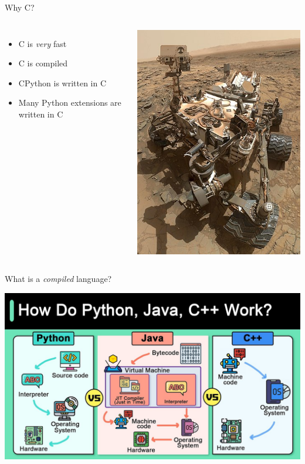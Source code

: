 \documentclass[12pt, aspectration=169]{beamer}
\begin{document}
    \begin{frame}{Why C?}
        \begin{columns}
            \begin{itemize}
                \item C is \textit{very} fast
                \item C is compiled
                \item CPython is written in C
                \item Many Python extensions are written in C
            \end{itemize}
            \includegraphics[scale=0.35]{static/images/390px-Curiosity_Self-Portrait_at_'Big_Sky'_Drilling_Site}
        \end{columns}
    \end{frame}

    \begin{frame}{What is a \textit{compiled} language?}
        \begin{center}
            \includegraphics[scale=0.25]{static/images/how_python_works}
        \end{center}
    \end{frame}
\end{document}
